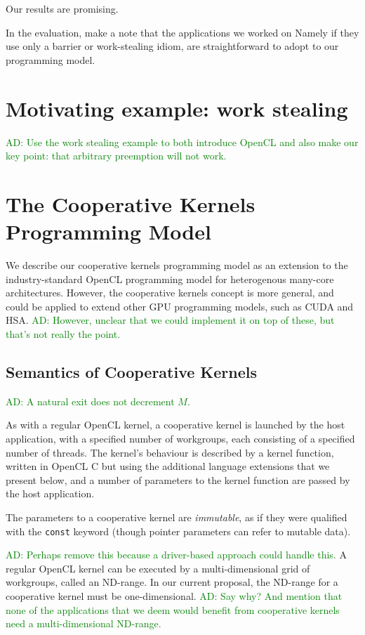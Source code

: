 \documentclass[nocopyrightspace]{sigplanconf-pldi16}
\newcommand{\ADComment}[1]{\textcolor{green}{AD: #1}}
\begin{document}
Our results are promising.

In the evaluation, make a note that the applications we worked on
Namely if they use only a barrier or work-stealing idiom, are
straightforward to adopt to our programming model.



\section{Motivating example: work stealing}

\ADComment{Use the work stealing example to both introduce OpenCL and
  also make our key point: that arbitrary preemption will not work.}


\section{The Cooperative Kernels Programming Model}

We describe our cooperative kernels programming model as an extension
to the industry-standard OpenCL programming model for heterogenous
many-core architectures.  However, the cooperative kernels concept is
more general, and could be applied to extend other GPU programming
models, such as CUDA and HSA.  \ADComment{However, unclear that we could implement it on top of these, but that's not really the point.}

\subsection{Semantics of Cooperative Kernels}

\ADComment{A natural exit does not decrement $M$.}

As with a regular OpenCL kernel, a cooperative kernel is launched by
the host application, with a specified number of workgroups, each
consisting of a specified number of threads.  The kernel's behaviour
is described by a kernel function, written in OpenCL C but using the
additional language extensions that we present below, and a number of
parameters to the kernel function are passed by the host application.

The parameters to a cooperative kernel are \emph{immutable}, as if
they were qualified with the \texttt{const} keyword (though pointer
parameters can refer to mutable data).

\ADComment{Perhaps remove this because a driver-based approach could handle this.}
A regular OpenCL kernel can be executed by a multi-dimensional grid of
workgroups, called an ND-range.  In our current proposal, the ND-range
for a cooperative kernel must be one-dimensional.  \ADComment{Say why?
  And mention that none of the applications that we deem would benefit
  from cooperative kernels need a multi-dimensional ND-range.}
\end{document}
